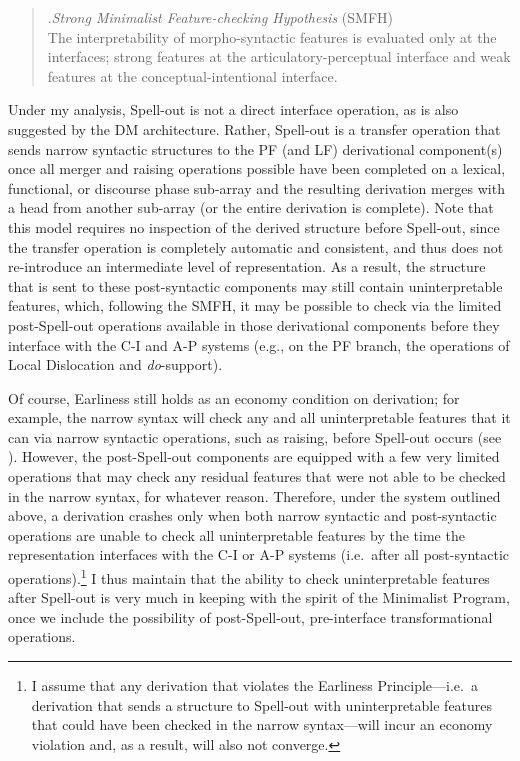 \singlespacing
\begin{quote}
\ex.{\it Strong Minimalist Feature-checking Hypothesis} (SMFH)\\
The interpretability of morpho-syntactic features is evaluated only at the interfaces; strong features at the articulatory-perceptual interface and weak features at the conceptual-intentional interface.

\end{quote}
\onehalfspacing

Under my analysis, Spell-out is not a direct interface operation, as is also suggested by the DM architecture. Rather, Spell-out is a transfer operation that sends narrow syntactic structures to the PF (and LF) derivational component(s) once all merger and raising operations possible have been completed on a lexical, functional, or discourse phase sub-array and the resulting derivation merges with a head from another sub-array (or the entire derivation is complete). Note that this model requires no inspection of the derived structure before Spell-out, since the transfer operation is completely automatic and consistent, and thus does not re-introduce an intermediate level of representation. As a result, the structure that is sent to these post-syntactic components may still contain uninterpretable features, which, following the SMFH, it may be possible to check via the limited post-Spell-out operations available in those derivational components before they interface with the C-I and A-P systems (e.g., on the PF branch, the operations of Local Dislocation and {\it do}-support).

Of course, Earliness still holds as an economy condition on derivation; for example, the narrow syntax will check any and all uninterpretable features that it can via narrow syntactic operations, such as raising, before Spell-out occurs (see \LLast). However, the post-Spell-out components are equipped with a few very limited operations that may check any residual features that were not able to be checked in the narrow syntax, for whatever reason. Therefore, under the system outlined above, a derivation crashes only when both narrow syntactic and post-syntactic operations are unable to check all uninterpretable features by the time the representation interfaces with the C-I or A-P systems (i.e.\ after all post-syntactic operations).\footnote{I assume that any derivation that violates the Earliness Principle---i.e.\ a derivation that sends a structure to Spell-out with uninterpretable features that could have been checked in the narrow syntax---will incur an economy violation and, as a result, will also not converge.}  I thus maintain that the ability to check uninterpretable features after Spell-out is very much in keeping with the spirit of the Minimalist Program, once we include the possibility of post-Spell-out, pre-interface transformational operations.

